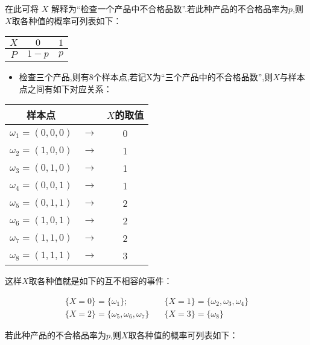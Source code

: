 在此可将 $ X $ 解释为“检查一个产品中不合格品数”.若此种产品的不合格品率为$ p $,则$ X $取各种值的概率可列表如下：

\begin{table}[htbp]
	\centering
	\begin{tabular}{c|cc}
		$ X $     & $ 0 $     & $ 1 $ \\\hline
		$ P $     & $ 1-p $   & $ p $ \\
	\end{tabular}%
\end{table}%


\begin{itemize}
	\item 检查三个产品,则有8个样本点,若记X为“三个产品中的不合格品数”,则$ X $与样本点之间有如下对应关系：
\end{itemize}

\begin{table}[htbp]
	\centering
	\begin{tabular}{ccc}
		样本点   &       & $ X $的取值 \\\hline
		$ \omega_1=(0,0,0) $ &   $ \longrightarrow $    & 0 \\
		$ \omega_2=(1,0,0) $ &   $ \longrightarrow $    & 1 \\
		$ \omega_3=(0,1,0) $ &   $ \longrightarrow $    & 1 \\
		$ \omega_4=(0,0,1) $ &   $ \longrightarrow $    & 1 \\
		$ \omega_5=(0,1,1) $ &   $ \longrightarrow $    & 2 \\
		$ \omega_6=(1,0,1) $ &   $ \longrightarrow $    & 2 \\
		$ \omega_7=(1,1,0) $ &   $ \longrightarrow $    & 2 \\
		$ \omega_8=(1,1,1) $ &   $ \longrightarrow $    & 3 \\
	\end{tabular}%
\end{table}%

这样$ X $取各种值就是如下的互不相容的事件：

\begin{equation} 
\begin{array}{ll}
{ \{ X=0 \}=\{\omega_{1}\} ;} & \{  X=1 \}=\{\omega_{2}, \omega_{3}, \omega_{4} \} \\ 
{ \{ X=2 \}=\{\omega_{5}, \omega_{6}, \omega_{7}\}}\quad &{\{ X=3\}=\{ \omega_{8} \}}
\end{array}
\end{equation}

若此种产品的不合格品率为$ p $,则$ X $取各种值的概率可列表如下：

